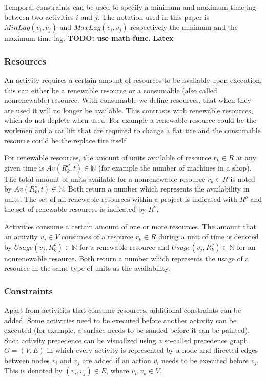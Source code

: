 \documentclass{article}
\newcommand{\TODO}[1]{{\color{red}\textbf{TODO: #1}}}
\newcommand{\renres}[0]{R^\rho} %
\newcommand{\conres}[0]{R^\nu} %
\newcommand{\av}[1]{\textit{Av}(#1)} %
\newcommand{\usage}[1]{\textit{Usage}(#1)} %
\begin{document}
Temporal constraints can be used to specify a minimum and maximum time lag between two activities $i$ and $j$.
The notation used in this paper is $MinLag(v_i, v_j)$ and $MaxLag(v_i, v_j)$ respectively the minimum and the maximum time lag.
\TODO{use math func. Latex}

\subsubsection{Resources}
An activity requires a certain amount of resources to be available upon execution, this can either be a renewable resource or a consumable (also called nonrenewable) resource.
With consumable we define resources, that when they are used it will no longer be available.
This contrasts with renewable resources, which do not deplete when used.
For example a renewable resource could be the workmen and a car lift that are required to change a flat tire and the consumable resource could be the replace tire itself.

For renewable resources, the amount of units available of resource $r_k \in R$ at any given time is $\av{\renres_k, t} \in \mathbb{N}$ (for example the number of machines in a shop).
The total amount of units available for a nonrenewable resource $r_k \in R$ is noted by $\av{\conres_k, t} \in \mathbb{N}$.
Both return a number which represents the availability in units.
The set of all renewable resources within a project is indicated with $\renres$ and the set of renewable resources is indicated by $\conres$. 

Activities consume a certain amount of one or more resources.
The amount that an activity $v_j \in V$ consumes of a resource $r_k \in R$ during a unit of time is denoted by $\usage{v_j, \renres_k} \in \mathbb{N}$ for a renewable resource and   $\usage{v_j, \conres_k} \in \mathbb{N}$ for an nonrenewable resource.
Both return a number which represents the usage of a resource in the same type of units as the availability.


\subsubsection{Constraints}
Apart from activities that consume resources, additional constraints can be added.
Some activities need to be executed before another activity can be executed (for example, a surface needs to be sanded before it can be painted).
Such activity precedence can be visualized using a so-called precedence graph $G = (V, E)$ in which every activity is represented by a node and directed edges between nodes $v_i$ and $v_j$ are added if an action $v_i$ needs to be executed before $v_j$.
This is denoted by $(v_i,v_j) \in E$, where $v_i, v_k \in V$.
\end{document}
